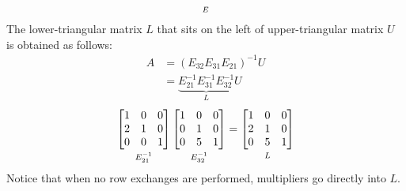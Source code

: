 \documentclass[../main.tex]{subfiles}
\begin{document}
{\[{}_{\mathstrut E}
\]
The lower-triangular matrix $L$ that sits on the left of  upper-triangular matrix $U$ is obtained as follows:
\[
\begin{aligned}
A &= (E_{32}E_{31}E_{21})^{-1}U \\
  &= \underbrace{E_{21}^{-1}E_{31}^{-1}E_{32}^{-1}}_{L}U
\end{aligned}
\]
\[
\underbracket[0pt][0pt]{
\begin{bmatrix*}[r]
1 & 0 & 0 \\
2 & 1 & 0 \\
0 & 0 & 1
\end{bmatrix*}
}_{\mathstrut E_{21}^{-1}}
\underbracket[0pt][0pt]{
\begin{bmatrix*}[r]
1 & 0 & 0 \\
0 & 1 & 0 \\
0 & 5 & 1
\end{bmatrix*}
}_{\mathstrut E_{32}^{-1}}
=
\underbracket[0pt][0pt]{
\begin{bmatrix*}
1 & 0 & 0 \\
2 & 1 & 0 \\
0 & 5 & 1
\end{bmatrix*}
}_{\mathstrut L}
\]
Notice that when no row exchanges are performed, multipliers go directly into $L$.
}


\onlyinsubfile{\end{multicols*}}
\end{document}
